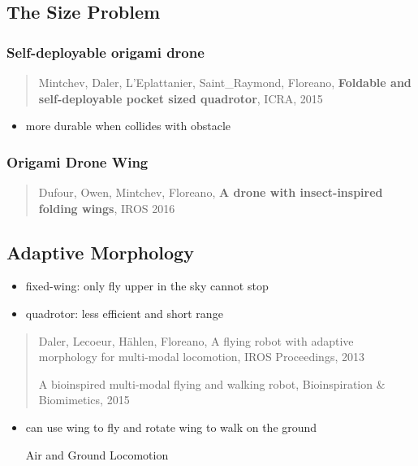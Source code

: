 \documentclass[]{article}
\begin{document}
\subsection{The Size Problem}\label{header-n2530}

\subsubsection{Self-deployable origami drone}\label{header-n2531}

\begin{quote}
Mintchev, Daler, L'Eplattanier, Saint\_Raymond, Floreano,
\textbf{Foldable and self-deployable pocket sized quadrotor}, ICRA, 2015
\end{quote}

\begin{itemize}
\item
  more durable when collides with obstacle
\end{itemize}

\subsubsection{Origami Drone Wing}\label{header-n2537}

\begin{quote}
Dufour, Owen, Mintchev, Floreano, \textbf{A drone with insect-inspired
folding wings}, IROS 2016
\end{quote}

\subsection{Adaptive Morphology}\label{header-n2540}

\begin{itemize}
\item
  fixed-wing: only fly upper in the sky cannot stop
\item
  quadrotor: less efficient and short range
\end{itemize}

\begin{quote}
Daler, Lecoeur, Hählen, Floreano, A flying robot with adaptive
morphology for multi-modal locomotion, IROS Proceedings, 2013

A bioinspired multi-modal flying and walking robot, Bioinspiration \&
Biomimetics, 2015
\end{quote}

\begin{itemize}
\item
  can use wing to fly and rotate wing to walk on the ground

  Air and Ground Locomotion
\end{itemize}
\end{document}
